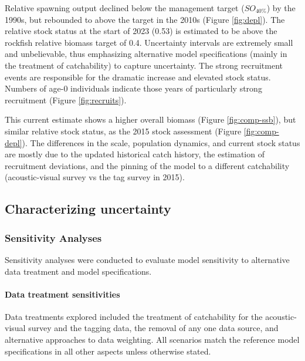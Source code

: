 \documentclass[11pt,
  english,
  letterpaper,
]{article}
\begin{document}
Relative spawning output declined below the management target (\(SO_{40\%}\)) by the 1990s, but rebounded to above the target in the 2010s (Figure \ref{fig:depl}). The relative stock status at the start of 2023 (0.53) is estimated to be above the rockfish relative biomass target of 0.4. Uncertainty intervals are extremely small and unbelievable, thus emphasizing alternative model specifications (mainly in the treatment of catchability) to capture uncertainty. The strong recruitment events are responsible for the dramatic increase and elevated stock status. Numbers of age-0 individuals indicate those years of particularly strong recruitment (Figure \ref{fig:recruits}).

This current estimate shows a higher overall biomass (Figure \ref{fig:comp-ssb}), but similar relative stock status, as the 2015 stock assessment (Figure \ref{fig:comp-depl}). The differences in the scale, population dynamics, and current stock status are mostly due to the updated historical catch history, the estimation of recruitment deviations, and the pinning of the model to a different catchability (acoustic-visual survey vs the tag survey in 2015).

\hypertarget{characterizing-uncertainty}{%
\subsection{Characterizing uncertainty}\label{characterizing-uncertainty}}

\hypertarget{sensitivity-analyses}{%
\subsubsection{Sensitivity Analyses}\label{sensitivity-analyses}}

Sensitivity analyses were conducted to evaluate model sensitivity to alternative data treatment and model specifications.

\hypertarget{data-treatment-sensitivities}{%
\paragraph{Data treatment sensitivities}\label{data-treatment-sensitivities}}

Data treatments explored included the treatment of catchability for the acoustic-visual survey and the tagging data, the removal of any one data source, and alternative approaches to data weighting. All scenarios match the reference model specifications in all other aspects unless otherwise stated.
\end{document}
